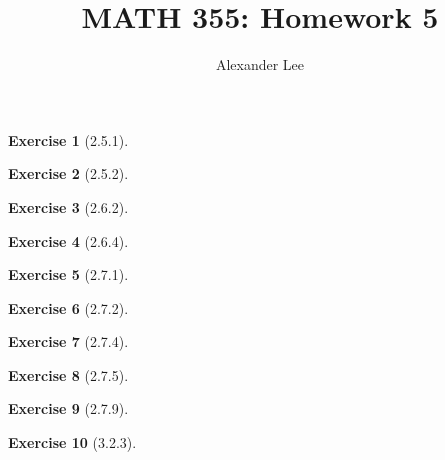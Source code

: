 \documentclass{amsart}
\title{MATH 355: Homework 5}
\author{Alexander Lee}
\theoremstyle{definition}
\newtheorem{exercise}{Exercise}
\begin{document}
\maketitle

\begin{exercise}[2.5.1]
\end{exercise}

\begin{exercise}[2.5.2]
\end{exercise}

\begin{exercise}[2.6.2]
\end{exercise}

\begin{exercise}[2.6.4]
\end{exercise}

\begin{exercise}[2.7.1]
\end{exercise}

\begin{exercise}[2.7.2]
\end{exercise}

\begin{exercise}[2.7.4]
\end{exercise}

\begin{exercise}[2.7.5]
\end{exercise}


\begin{exercise}[2.7.9]
\end{exercise}

\begin{exercise}[3.2.3]
\end{exercise}
\end{document}
